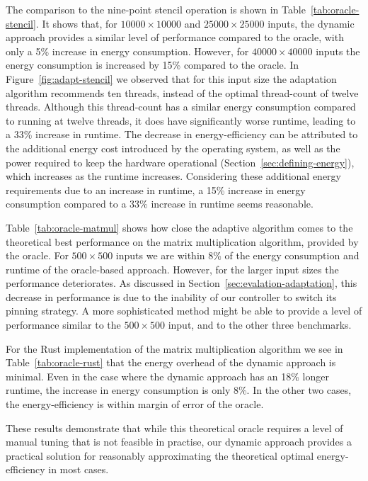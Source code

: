 The comparison to the nine-point stencil operation is shown in Table~\ref{tab:oracle-stencil}.
It shows that, for $10000 \times 10000$ and $25000 \times 25000$ inputs, the dynamic approach provides a similar level of performance compared to the oracle, with only a 5\% increase in energy consumption.
However, for $40000 \times 40000$ inputs the energy consumption is increased by 15\% compared to the oracle.
In Figure~\ref{fig:adapt-stencil} we observed that for this input size the adaptation algorithm recommends ten threads, instead of the optimal thread-count of twelve threads.
Although this thread-count has a similar energy consumption compared to running at twelve threads, it does have significantly worse runtime, leading to a 33\% increase in runtime.
The decrease in energy-efficiency can be attributed to the additional energy cost introduced by the operating system, as well as the power required to keep the hardware operational (Section~\ref{sec:defining-energy}), which increases as the runtime increases.
Considering these additional energy requirements due to an increase in runtime, a 15\% increase in energy consumption compared to a 33\% increase in runtime seems reasonable.

Table~\ref{tab:oracle-matmul} shows how close the adaptive algorithm comes to the theoretical best performance on the matrix multiplication algorithm, provided by the oracle.
For $500 \times 500$ inputs we are within 8\% of the energy consumption and runtime of the oracle-based approach.
However, for the larger input sizes the performance deteriorates.
As discussed in Section~\ref{sec:evalation-adaptation}, this decrease in performance is due to the inability of our controller to switch its pinning strategy.
A more sophisticated method might be able to provide a level of performance similar to the $500 \times 500$ input, and to the other three benchmarks.

For the Rust implementation of the matrix multiplication algorithm we see in Table~\ref{tab:oracle-rust} that the energy overhead of the dynamic approach is minimal.
Even in the case where the dynamic approach has an 18\% longer runtime, the increase in energy consumption is only 8\%.
In the other two cases, the energy-efficiency is within margin of error of the oracle.

These results demonstrate that while this theoretical oracle requires a level of manual tuning that is not feasible in practise, our dynamic approach provides a practical solution for reasonably approximating the theoretical optimal energy-efficiency in most cases.

